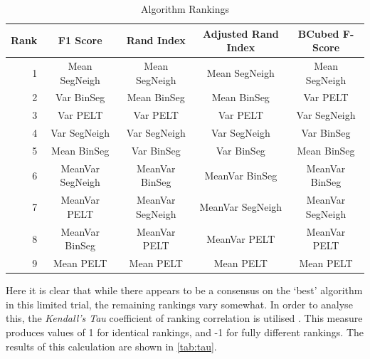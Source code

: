 \documentclass[../main.tex]{subfiles}
\begin{document}
\begin{table}[h]
\centering
\begin{tabular}{@{}rcccc@{}}
\toprule
\textbf{Rank} & \textbf{F1 Score} & \textbf{Rand Index} & \textbf{Adjusted Rand Index} & \textbf{BCubed F-Score} \\ \midrule
1 & Mean SegNeigh & Mean SegNeigh & Mean SegNeigh & Mean SegNeigh \\
2 & Var BinSeg & Mean BinSeg & Mean BinSeg & Var PELT \\
3 & Var PELT & Var PELT & Var PELT & Var SegNeigh \\
4 & Var SegNeigh & Var SegNeigh & Var SegNeigh & Var BinSeg \\
5 & Mean BinSeg & Var BinSeg & Var BinSeg & Mean BinSeg \\
6 & MeanVar SegNeigh & MeanVar BinSeg & MeanVar BinSeg & MeanVar BinSeg \\
7 & MeanVar PELT & MeanVar SegNeigh & MeanVar SegNeigh & MeanVar SegNeigh \\
8 & MeanVar BinSeg & MeanVar PELT & MeanVar PELT & MeanVar PELT \\
9 & Mean PELT & Mean PELT & Mean PELT & Mean PELT \\ \bottomrule
\end{tabular}
\caption{Algorithm Rankings}
\label{tab:rankings}
\end{table}

\pagebreak

Here it is clear that while there appears to be a consensus on the `best' algorithm in this limited trial, the remaining rankings vary somewhat. In order to analyse this, the \emph{Kendall's Tau} coefficient of ranking correlation is utilised \cite{KENDALL1938}. This measure produces values of 1 for identical rankings, and -1 for fully different rankings. The results of this calculation are shown in \autoref{tab:tau}.
\end{document}
